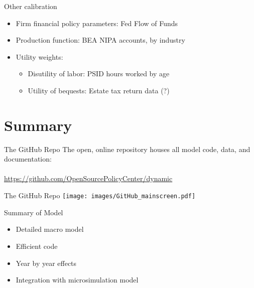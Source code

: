 \documentclass{beamer}
\begin{document}
\begin{frame}{Other calibration}
\begin{itemize}
\item Firm financial policy parameters: Fed Flow of Funds
\item Production function: BEA NIPA accounts, by industry
\item Utility weights:
	\begin{itemize}
	\item Disutility of labor: PSID hours worked by age
	\item Utility of bequests: Estate tax return data (?)
	\end{itemize}
\end{itemize}
\end{frame}

\section{Summary}

  \begin{frame}{The GitHub Repo}
  The open, online repository houses all model code, data, and documentation: \\
  \ \\
\href{https://github.com/OpenSourcePolicyCenter/dynamic}{https://github.com/OpenSourcePolicyCenter/dynamic}
  \end{frame}


    \begin{frame}{The GitHub Repo}
  \texttt{[image: images/GitHub\_mainscreen.pdf]}
  \end{frame}

  \begin{frame}{Summary of Model}
  \begin{itemize}
      \item Detailed macro model
      \item Efficient code
      \item Year by year effects
      \item Integration with microsimulation model
  \end{itemize}
  \end{frame}
\end{document}
